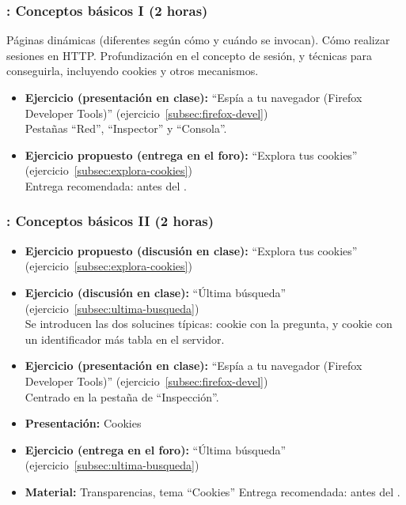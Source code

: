 \documentclass[a4paper,12pt]{article}
\begin{document}
\subsubsection{\juevesA: Conceptos básicos I (2 horas)}
\label{cal:juevesA}

Páginas dinámicas (diferentes según cómo y cuándo se invocan). Cómo realizar sesiones en HTTP. Profundización en el concepto de sesión, y técnicas para conseguirla, incluyendo cookies y otros mecanismos.

\begin{itemize}
\item \textbf{Ejercicio (presentación en clase):} ``Espía a tu navegador (Firefox Developer Tools)'' (ejercicio~\ref{subsec:firefox-devel}) \\
  Pestañas ``Red'', ``Inspector'' y ``Consola''.
\item \textbf{Ejercicio propuesto (entrega en el foro):} ``Explora tus cookies'' (ejercicio~\ref{subsec:explora-cookies}) \\
  Entrega recomendada: antes del \juevesB.
\end{itemize}


\subsubsection{\juevesB: Conceptos básicos II (2 horas)}
\label{cal:juevesB}

\begin{itemize}
\item \textbf{Ejercicio propuesto (discusión en clase):} ``Explora tus cookies'' (ejercicio~\ref{subsec:explora-cookies}) \\
\item \textbf{Ejercicio (discusión en clase):} ``Última búsqueda'' (ejercicio~\ref{subsec:ultima-busqueda}) \\
  Se introducen las dos solucines típicas: cookie con la pregunta, y cookie con un identificador más tabla en el servidor.
\item \textbf{Ejercicio (presentación en clase):} ``Espía a tu navegador (Firefox Developer Tools)'' (ejercicio~\ref{subsec:firefox-devel}) \\
  Centrado en la pestaña de ``Inspección''.
\item \textbf{Presentación:} Cookies
\item \textbf{Ejercicio (entrega en el foro):} ``Última búsqueda'' (ejercicio~\ref{subsec:ultima-busqueda}) \\
\item \textbf{Material:} Transparencias, tema ``Cookies''
  Entrega recomendada: antes del \juevesC. \\
\end{itemize}
\end{document}
